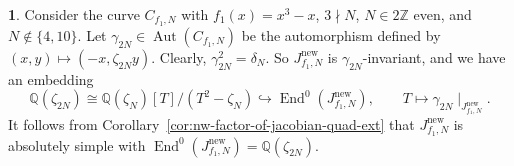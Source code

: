 \documentclass{amsart}[11pt]
\theoremstyle{definition}
\newtheorem{sect}[thm]{}
\numberwithin{equation}{section}
\theoremstyle{notitle}
\begin{document}
 \begin{sect}
   Consider the curve $C_{f_1, N}$ with $f_1(x)=x^3-x$, $3\nmid N$,
   $N\in 2{\mathbb{Z}}$ even, and $N\not\in \{4, 10\}$. Let $\gamma_{2N}\in
   \operatorname{Aut}(C_{f_1,N})$ be the automorphism defined by $(x,y)\mapsto (-x,
   \zeta_{2N}y)$. Clearly, $\gamma_{2N}^2= \delta_N$. So
   $J_{f_1,N}^{\mathrm{new}}$ is $\gamma_{2N}$-invariant, and we have an
   embedding
   \[ {\mathbb{Q}}(\zeta_{2N})\cong
   {\mathbb{Q}}(\zeta_N)[T]/(T^2-\zeta_N)\hookrightarrow \operatorname{End}^0(J_{f_1,
     N}^{\mathrm{new}}), \qquad T\mapsto \gamma_{2N}\mid_{ J_{f_1, N}^{\mathrm{new}}}.\] It
   follows from Corollary~\ref{cor:nw-factor-of-jacobian-quad-ext}
   that $J_{f_1,N}^{\mathrm{new}}$ is absolutely simple with
   $\operatorname{End}^0(J_{f_1,N}^{\mathrm{new}})={\mathbb{Q}}(\zeta_{2N})$.
 \end{sect}
\end{document}
